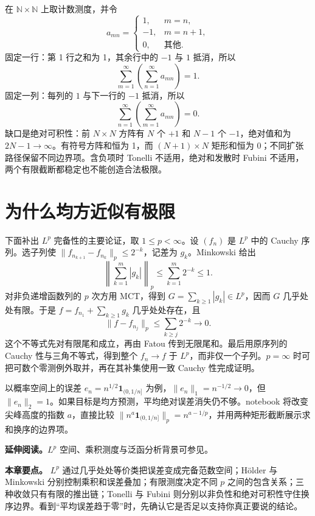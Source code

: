 
在 $\mathbb N\times\mathbb N$ 上取计数测度，并令
\[
 a_{mn}=\begin{cases}
  1,&m=n,\\
 -1,&m=n+1,\\
  0,&\text{其他}.
 \end{cases}
\]
固定一行：第 1 行之和为 1，其余行中的 $-1$ 与 $1$ 抵消，所以
\[
 \sum_{m=1}^{\infty}\left(\sum_{n=1}^{\infty}a_{mn}\right)=1.
\]
固定一列：每列的 $1$ 与下一行的 $-1$ 抵消，所以
\[
 \sum_{n=1}^{\infty}\left(\sum_{m=1}^{\infty}a_{mn}\right)=0.
\]
缺口是绝对可积性：前 $N\times N$ 方阵有 $N$ 个 $+1$ 和 $N-1$ 个 $-1$，绝对值和为 $2N-1\to\infty$。有符号方阵和恒为 1，而 $(N+1)\times N$ 矩形和恒为 0；不同扩张路径保留不同边界项。含负项时 Tonelli 不适用，绝对和发散时 Fubini 不适用，两个有限截断都稳定也不能创造合法极限。

\section{为什么均方近似有极限}
下面补出 $L^p$ 完备性的主要论证，取 $1\leq p<\infty$。设 $(f_n)$ 是 $L^p$ 中的 Cauchy 序列。选子列使 $\|f_{n_{k+1}}-f_{n_k}\|_p\leq2^{-k}$，记差为 $g_k$。Minkowski 给出
\[
 \left\|\sum_{k=1}^m|g_k|\right\|_p\leq\sum_{k=1}^m2^{-k}\leq1.
\]
对非负递增函数列的 $p$ 次方用 MCT，得到 $G=\sum_{k\geq1}|g_k|\in L^p$，因而 $G$ 几乎处处有限。于是 $f=f_{n_1}+\sum_{k\geq1}g_k$ 几乎处处存在，且
\[
 \|f-f_{n_j}\|_p\leq\sum_{k\geq j}2^{-k}\longrightarrow0.
\]
这个不等式先对有限尾和成立，再由 Fatou 传到无限尾和。最后用原序列的 Cauchy 性与三角不等式，得到整个 $f_n\to f$ 于 $L^p$，而非仅一个子列。$p=\infty$ 时可把可数个零测例外取并，再在其补集使用一致 Cauchy 性完成证明。

以概率空间上的误差 $e_n=n^{1/2}\mathbf1_{(0,1/n]}$ 为例，$\|e_n\|_1=n^{-1/2}\to0$，但 $\|e_n\|_2=1$。如果目标是均方预测，平均绝对误差消失仍不够。notebook 将改变尖峰高度的指数 $a$，直接比较 $\|n^a\mathbf1_{(0,1/n]}\|_p=n^{a-1/p}$，并用两种矩形截断展示求和换序的边界项。

\noindent\textbf{延伸阅读。}$L^p$ 空间、乘积测度与泛函分析背景可参见\cite{brezis2011analysis,folland1999analysis}。




\noindent\textbf{本章要点。} $L^p$ 通过几乎处处等价类把误差变成完备范数空间；Hölder 与 Minkowski 分别控制乘积和误差叠加；有限测度决定不同 $p$ 之间的包含关系；三种收敛只有有限的推出链；Tonelli 与 Fubini 则分别以非负性和绝对可积性守住换序边界。看到“平均误差趋于零”时，先确认它是否足以支持你真正要说的结论。
